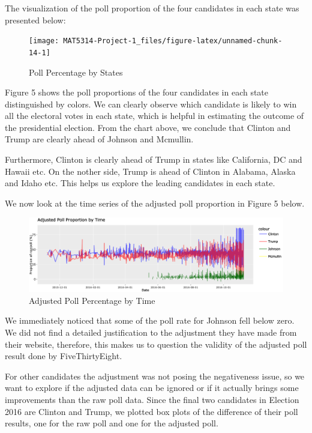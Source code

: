 \documentclass[
  12pt,
]{article}
\begin{document}
The visualization of the poll proportion of the four candidates in each
state was presented below:

\begin{minipage}[t]{0.7\textwidth}
\begin{figure}
\texttt{[image: MAT5314-Project-1\_files/figure-latex/unnamed-chunk-14-1]} \caption{Poll Percentage by States}\label{fig:unnamed-chunk-14}
\end{figure}
\end{minipage}
\begin{minipage}[t]{0.3\textwidth}
\vspace{0pt}
Figure 5 shows the poll proportions of the four candidates in each state distinguished by colors. We can clearly observe which candidate is likely to win all the electoral votes in each state, which is helpful in estimating the outcome of the presidential election. From the chart above, we conclude that Clinton and Trump are clearly ahead of Johnson and Mcmullin. 
\end{minipage}

Furthermore, Clinton is clearly ahead of Trump in states like
California, DC and Hawaii etc. On the nother side, Trump is ahead of
Clinton in Alabama, Alaska and Idaho etc. This helps us explore the
leading candidates in each state.

We now look at the time series of the adjusted poll proportion in Figure
5 below.

\begin{figure}
\centering
\includegraphics{./Figures/TsChart.png}
\caption{Adjusted Poll Percentage by Time}
\end{figure}

We immediately noticed that some of the poll rate for Johnson fell below
zero. We did not find a detailed justification to the adjustment they
have made from their website, therefore, this makes us to question the
validity of the adjusted poll result done by FiveThirtyEight.

For other candidates the adjustment was not posing the negativeness
issue, so we want to explore if the adjusted data can be ignored or if
it actually brings some improvements than the raw poll data. Since the
final two candidates in Election 2016 are Clinton and Trump, we plotted
box plots of the difference of their poll results, one for the raw poll
and one for the adjusted poll.
\end{document}
